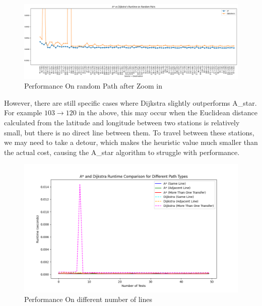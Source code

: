 \documentclass{article}
\begin{document}
\begin{onehalfspace}
\begin{figure}[H]  
\centering
\includegraphics[width=\textwidth]{part5_graph5.png}
\caption{Performance On random Path after Zoom in}
\end{figure}



However, there are still specific cases where Dijkstra slightly outperforms A\_star. For example $ 103 \rightarrow 120 $ in the above, this may occur when the Euclidean distance calculated from the latitude and longitude between two stations is relatively small, but there is no direct line between them. To travel between these stations, we may need to take a detour, which makes the heuristic value much smaller than the actual cost, causing the A\_star algorithm to struggle with performance.


\begin{figure}[H]  
\centering
\includegraphics[width=\textwidth]{part5_graph6.png}
\caption{Performance On different number of lines}
\end{figure}



\end{onehalfspace}
\end{document}
